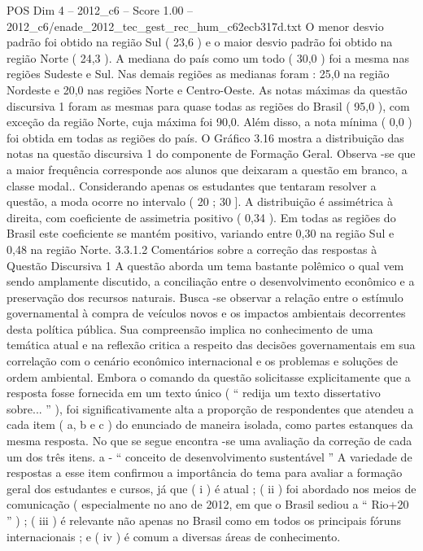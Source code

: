 \begin{textsample}{POS Dim 4 – 2012\_c6 – Score 1.00 – 2012\_c6/enade\_2012\_tec\_gest\_rec\_hum\_c62ecb317d.txt}
O menor desvio padrão foi obtido na região Sul ( 23,6 ) e o maior desvio padrão foi obtido na região Norte ( 24,3 ).
A mediana do país como um todo ( 30,0 ) foi a mesma nas regiões Sudeste e Sul.
Nas demais regiões as medianas foram : 25,0 na região Nordeste e 20,0 nas regiões Norte e Centro-Oeste.
As notas máximas da questão discursiva 1 foram as mesmas para quase todas as regiões do Brasil ( 95,0 ), com exceção da região Norte, cuja máxima foi 90,0.
Além disso, a nota mínima ( 0,0 ) foi obtida em todas as regiões do país.
O Gráfico 3.16 mostra a distribuição das notas na questão discursiva 1 do componente de Formação Geral.
Observa -se que a maior frequência corresponde aos alunos que deixaram a questão em branco, a classe modal..
Considerando apenas os estudantes que tentaram resolver a questão, a moda ocorre no intervalo ( 20 ; 30 ].
A distribuição é assimétrica à direita, com coeficiente de assimetria positivo ( 0,34 ).
Em todas as regiões do Brasil este coeficiente se mantém positivo, variando entre 0,30 na região Sul e 0,48 na região Norte. 3.3.1.2 Comentários sobre a correção das respostas à Questão Discursiva 1 A questão aborda um tema bastante polêmico o qual vem sendo amplamente discutido, a conciliação entre o desenvolvimento econômico e a preservação dos recursos naturais.
Busca -se observar a relação entre o estímulo governamental à compra de veículos novos e os impactos ambientais decorrentes desta política pública.
Sua compreensão implica no conhecimento de uma temática atual e na reflexão critica a respeito das decisões governamentais em sua correlação com o cenário econômico internacional e os problemas e soluções de ordem ambiental.
Embora o comando da questão solicitasse explicitamente que a resposta fosse fornecida em um texto único ( “ redija um texto dissertativo sobre... ” ), foi significativamente alta a proporção de respondentes que atendeu a cada item ( a, b e c ) do enunciado de maneira isolada, como partes estanques da mesma resposta.
No que se segue encontra -se uma avaliação da correção de cada um dos três itens. a - “ conceito de desenvolvimento sustentável ” A variedade de respostas a esse item confirmou a importância do tema para avaliar a formação geral dos estudantes e cursos, já que ( i ) é atual ; ( ii ) foi abordado nos meios de comunicação ( especialmente no ano de 2012, em que o Brasil sediou a “ Rio+20 ” ) ; ( iii ) é relevante não apenas no Brasil como em todos os principais fóruns internacionais ; e ( iv ) é comum a diversas áreas de conhecimento.

\end{textsample}
